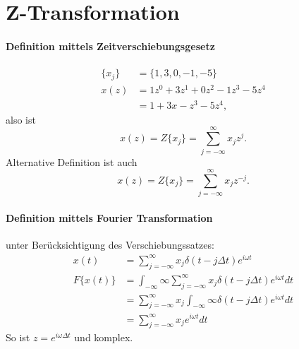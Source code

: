 \section{Z-Transformation}
\paragraph{Definition mittels Zeitverschiebungsgesetz}
\[
\begin{split}
\{x_j\} & = \{1,3,0,-1,-5\}\\
x(z) & = 1z^0+3z^1+0z^2-1z^3-5z^4\\
& = 1+3x-z^3-5z^4,
\end{split}
\]
also ist
\begin{equation}
x(z) = Z\{x_j\} = \sum_{j=-\infty}^{\infty} x_j z^j.
\end{equation}
Alternative Definition ist auch
\[
x(z) = Z\{x_j\} = \sum_{j=-\infty}^{\infty} x_j z^{-j}.
\]
\paragraph{Definition mittels Fourier Transformation} unter Berücksichtigung des Verschiebungssatzes:
\[
\begin{split}
x(t) & =  \sum_{j=-\infty}^{\infty} x_j \delta (t-j \Delta t) e^{i \omega t}\\
F\{x(t)\} & = \int_{-\infty}{\infty}  \sum_{j=-\infty}^{\infty} x_j \delta (t-j \Delta t) e^{i \omega t} dt\\
& = \sum_{j=-\infty}^{\infty} x_j \int_{-\infty}{\infty} \delta (t-j \Delta t) e^{i \omega t} dt\\
& = \sum_{j=-\infty}^{\infty} x_j e^{i \omega t} dt
\end{split}
\]
So ist $z = e^{i \omega \Delta t}$ und komplex.